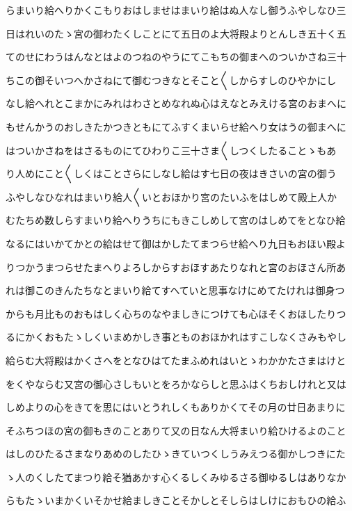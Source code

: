 \documentclass[a4paper,11pt,landscape]{ltjtarticle}
\begin{document}
らまいり給へりかくこもりおはしませはまいり給はぬ人なし御うふやしなひ三
\par\medskip
日はれいのたゝ宮の御わたくしことにて五日のよ大将殿よりとんしき五十く五
\par\medskip
てのせにわうはんなとはよのつねのやうにてこもちの御まへのついかさね三十
\par\medskip
ちこの御そいつへかさねにて御むつきなとそこと〱しからすしのひやかにし
\par\medskip
なし給へれとこまかにみれはわさとめなれぬ心はえなとみえける宮のおまへに
\par\medskip
もせんかうのおしきたかつきともにてふすくまいらせ給へり女はうの御まへに
\par\medskip
はついかさねをはさるものにてひわりこ三十さま〱しつくしたることゝもあ
\par\medskip
り人めにこと〱しくはことさらにしなし給はす七日の夜はきさいの宮の御う
\par\medskip
ふやしなひなれはまいり給人〱いとおほかり宮のたいふをはしめて殿上人か
\par\medskip
むたちめ数しらすまいり給へりうちにもきこしめして宮のはしめてをとなひ給
\par\medskip
なるにはいかてかとの給はせて御はかしたてまつらせ給へり九日もおほい殿よ
\par\medskip
りつかうまつらせたまへりよろしからすおほすあたりなれと宮のおほさん所あ
\par\medskip
れは御このきんたちなとまいり給てすへていと思事なけにめてたけれは御身つ
\par\medskip
からも月比ものおもはしく心ちのなやましきにつけても心ほそくおほしたりつ
\par\medskip
るにかくおもたゝしくいまめかしき事とものおほかれはすこしなくさみもやし
\par\medskip
給らむ大将殿はかくさへをとなひはてたまふめれはいとゝわかかたさまはけと
\par\medskip
をくやならむ又宮の御心さしもいとをろかならしと思ふはくちおしけれと又は
\par\medskip
しめよりの心をきてを思にはいとうれしくもありかくてその月の廿日あまりに
\par\medskip
そふちつほの宮の御もきのことありて又の日なん大将まいり給ひけるよのこと
\par\medskip
はしのひたるさまなりあめのしたひゝきていつくしうみえつる御かしつきにた
\par\medskip
ゝ人のくしたてまつり給そ猶あかす心くるしくみゆるさる御ゆるしはありなか
\par\medskip
らもたゝいまかくいそかせ給ましきことそかしとそしらはしけにおもひの給ふ
\end{document}
